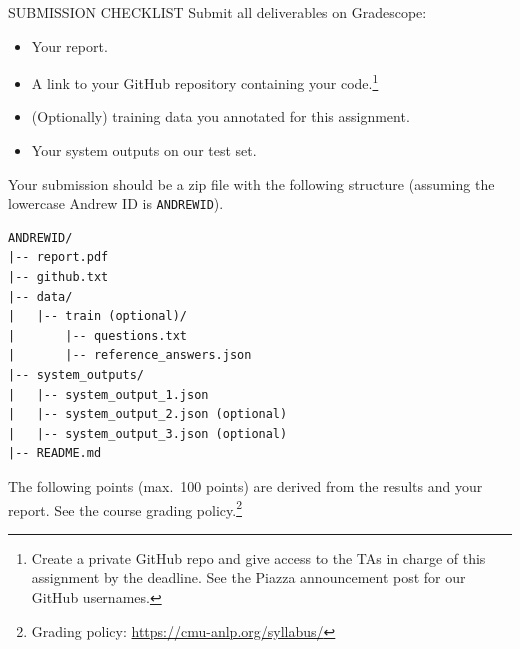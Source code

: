 \documentclass[11pt]{article}
\newcommand{\subsec}[1]{%
  \vspace{0.8em}
  \noindent{\sffamily\bfseries\color{mauve} #1}
  \vspace{0.35em}
  \par
}
\begin{document}
\begin{deliverables}{SUBMISSION CHECKLIST}
Submit all deliverables on Gradescope:
\begin{itemize}[nosep, leftmargin=1.6em]
  \item Your report.
  \item A link to your GitHub repository containing your code.\footnote{Create a private GitHub repo
    and give access to the TAs in charge of this assignment by the deadline. See the Piazza
    announcement post for our GitHub usernames.}
  \item (Optionally) training data you annotated for this assignment.
  \item Your system outputs on our test set.
\end{itemize}
\end{deliverables}

\noindent Your submission should be a zip file with the following structure (assuming the lowercase
Andrew ID is \texttt{ANDREWID}).

\begin{codebox}
\begin{verbatim}
ANDREWID/
|-- report.pdf
|-- github.txt
|-- data/
|   |-- train (optional)/
|       |-- questions.txt
|       |-- reference_answers.json
|-- system_outputs/
|   |-- system_output_1.json
|   |-- system_output_2.json (optional)
|   |-- system_output_3.json (optional)
|-- README.md
\end{verbatim}
\end{codebox}

\subsec{Grading}

\noindent The following points (max.\ 100 points) are derived from the results and your report. See
the course grading policy.\footnote{Grading policy: \url{https://cmu-anlp.org/syllabus/}}
\end{document}
